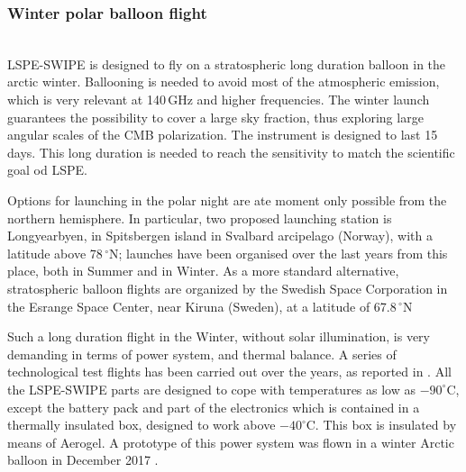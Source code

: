 \subsubsection{Winter polar balloon flight}
 \\
LSPE-SWIPE is designed to fly on a stratospheric long duration balloon in the arctic winter. 
Ballooning is needed to avoid most of the atmospheric emission, which is very relevant
at 140\,GHz and higher frequencies. The winter launch guarantees the possibility to 
cover a large sky fraction, thus exploring large angular scales of the CMB polarization. 
The instrument is designed to last 15 days. This long duration is needed to reach the
sensitivity to match the scientific goal od LSPE. 

Options for launching in the polar night are ate moment only possible from the 
northern hemisphere. In particular, two proposed launching station is 
Longyearbyen, in Spitsbergen island in Svalbard arcipelago (Norway), with a latitude 
above 78\,$^\circ$N; launches have been organised over the last years from 
this place, both in Summer and in Winter. 
As a more standard alternative, stratospheric balloon flights are organized by the Swedish 
Space Corporation in the Esrange Space Center, near Kiruna (Sweden), at
a latitude of 67.8\,$^\circ$N

Such a long duration flight in the Winter,
without solar illumination, is very demanding in terms of power system, and thermal 
balance. 
A series of technological test flights has been carried out over the years, as
reported in 
\citet{iarocci2008,peterzen_memsait2008,peterzen_cospar2008,peterzen_cospar2010,debernardisIAUS2013,wipica2018}.  
All the LSPE-SWIPE parts are designed to cope with temperatures as low as
$-90^\circ$C, except the battery pack and part of the electronics which is contained in 
a thermally insulated box, designed to work above $-40^\circ$C. This box is insulated
by means of Aerogel. A prototype of this power system was flown in a winter Arctic balloon 
in December 2017 \citep{wipica2018}. 


